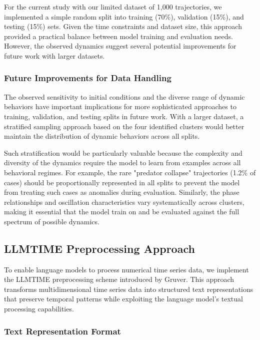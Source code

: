 \documentclass{article}
\begin{document}
For the current study with our limited dataset of 1,000 trajectories, we implemented a simple random split into training (70\%), validation (15\%), and testing (15\%) sets. Given the time constraints and dataset size, this approach provided a practical balance between model training and evaluation needs. However, the observed dynamics suggest several potential improvements for future work with larger datasets.

\subsubsection*{Future Improvements for Data Handling}
The observed sensitivity to initial conditions and the diverse range of dynamic behaviors have important implications for more sophisticated approaches to training, validation, and testing splits in future work. With a larger dataset, a stratified sampling approach based on the four identified clusters would better maintain the distribution of dynamic behaviors across all splits.

Such stratification would be particularly valuable because the complexity and diversity of the dynamics require the model to learn from examples across all behavioral regimes. For example, the rare "predator collapse" trajectories (1.2\% of cases) should be proportionally represented in all splits to prevent the model from treating such cases as anomalies during evaluation. Similarly, the phase relationships and oscillation characteristics vary systematically across clusters, making it essential that the model train on and be evaluated against the full spectrum of possible dynamics.

\subsection*{LLMTIME Preprocessing Approach}

To enable language models to process numerical time series data, we implement the LLMTIME preprocessing scheme introduced by Gruver\cite{gruver2023large}. This approach transforms multidimensional time series data into structured text representations that preserve temporal patterns while exploiting the language model's textual processing capabilities.

\subsubsection*{Text Representation Format}
\end{document}
